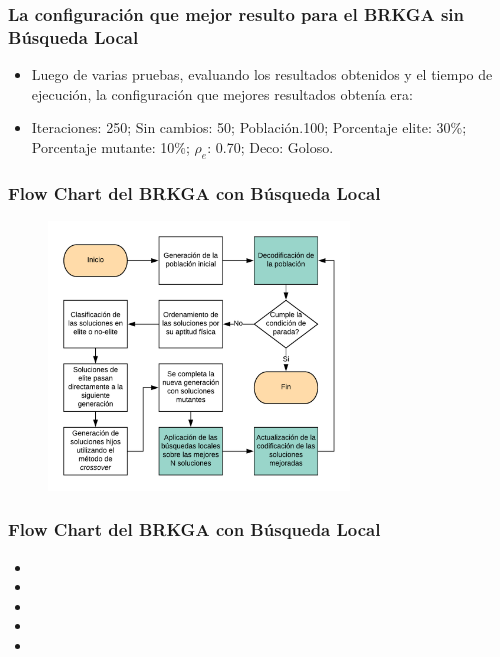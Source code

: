 \documentclass{beamer}
\begin{document}

\begin{frame}
\frametitle{La configuración que mejor resulto para el BRKGA sin Búsqueda Local}

\begin{itemize}
    \item Luego de varias pruebas, evaluando los resultados obtenidos y el tiempo de ejecución, la configuración que mejores resultados obtenía era:
    \pause
    \item Iteraciones: 250; Sin cambios: 50; Población.100; Porcentaje elite: 30\%; Porcentaje mutante: 10\%; $\rho_e$: 0.70; Deco: Goloso.
    \pause
\end{itemize}

\end{frame}


\begin{frame}
\frametitle{Flow Chart del BRKGA con Búsqueda Local}

\begin{figure}[h]
	\centering
	\includegraphics[width=8cm]{BRKGA_Flow_Chart_Implementado}
	\label{fig:BRKGA_Flow_Chart_Implementado}
\end{figure}

\end{frame}


\begin{frame}
\frametitle{Flow Chart del BRKGA con Búsqueda Local}

\begin{itemize}
    \item 
    \pause
    \item 
    \pause
    \item 
    \pause
    \item 
    \pause
    \item 
    \pause
\end{itemize}

\end{frame}
\end{document}
